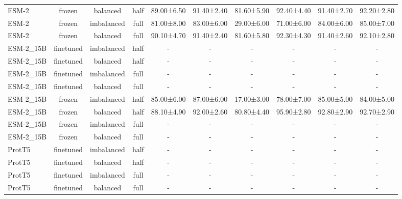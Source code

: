 \begin{tabular}{lccccccccc}
       ESM-2 &         frozen &   balanced &      half &  89.00±6.50 & 91.40±2.40 & 81.60±5.90 & 92.40±4.40 &  91.40±2.70 &  92.20±2.80 \\
       ESM-2 &         frozen & imbalanced &      full &  81.00±8.00 & 83.00±6.00 & 29.00±6.00 & 71.00±6.00 &  84.00±6.00 &  85.00±7.00 \\
       ESM-2 &         frozen &   balanced &      full &  90.10±4.70 & 91.40±2.40 & 81.60±5.80 & 92.30±4.30 &  91.40±2.60 &  92.10±2.80 \\
   ESM-2\_15B &      finetuned & imbalanced &      half &           - &          - &          - &          - &           - &           - \\
   ESM-2\_15B &      finetuned &   balanced &      half &           - &          - &          - &          - &           - &           - \\
   ESM-2\_15B &      finetuned & imbalanced &      full &           - &          - &          - &          - &           - &           - \\
   ESM-2\_15B &      finetuned &   balanced &      full &           - &          - &          - &          - &           - &           - \\
   ESM-2\_15B &         frozen & imbalanced &      half &  85.00±6.00 & 87.00±6.00 & 17.00±3.00 & 78.00±7.00 &  85.00±5.00 &  84.00±5.00 \\
   ESM-2\_15B &         frozen &   balanced &      half &  88.10±4.90 & 92.00±2.60 & 80.80±4.40 & 95.90±2.80 &  92.80±2.90 &  92.70±2.90 \\
   ESM-2\_15B &         frozen & imbalanced &      full &           - &          - &          - &          - &           - &           - \\
   ESM-2\_15B &         frozen &   balanced &      full &           - &          - &          - &          - &           - &           - \\
      ProtT5 &      finetuned & imbalanced &      half &           - &          - &          - &          - &           - &           - \\
      ProtT5 &      finetuned &   balanced &      half &           - &          - &          - &          - &           - &           - \\
      ProtT5 &      finetuned & imbalanced &      full &           - &          - &          - &          - &           - &           - \\
      ProtT5 &      finetuned &   balanced &      full &           - &          - &          - &          - &           - &           - \\

\end{tabular}
